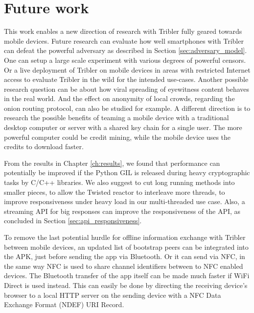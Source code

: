 \section{Future work}\label{sec:future_work}
This work enables a new direction of research with Tribler fully geared towards mobile devices.
Future research can evaluate how well smartphones with Tribler can defeat the powerful adversary as described in Section \ref{sec:adversary_model}.
One can setup a large scale experiment with various degrees of powerful censors.
Or a live deployment of Tribler on mobile devices in areas with restricted Internet access to evaluate Tribler in the wild for the intended use-cases.
Another possible research question can be about how viral spreading of eyewitness content behaves in the real world.
And the effect on anonymity of local crowds, regarding the onion routing protocol, can also be studied for example.
A different direction is to research the possible benefits of teaming a mobile device with a traditional desktop computer or server with a shared key chain for a single user.
The more powerful computer could be credit mining, while the mobile device uses the credits to download faster.

From the results in Chapter \ref{ch:results}, we found that performance can potentially be improved if the Python GIL is released during heavy cryptographic tasks by C/C++ libraries.
We also suggest to cut long running methods into smaller pieces, to allow the Twisted reactor to interleave more threads, to improve responsiveness under heavy load in our multi-threaded use case.
Also, a streaming API for big responses can improve the responsiveness of the API, as concluded in Section \ref{sec:api_responsiveness}.

To remove the last potential hurdle for offline information exchange with Tribler between mobile devices, an updated list of bootstrap peers can be integrated into the APK, just before sending the app via Bluetooth.
Or it can send via NFC, in the same way NFC is used to share channel identifiers between to NFC enabled devices.
The Bluetooth transfer of the app itself can be made much faster if WiFi Direct is used instead.
This can easily be done by directing the receiving device's browser to a local HTTP server on the sending device with a NFC Data Exchange Format (NDEF) URI Record.

